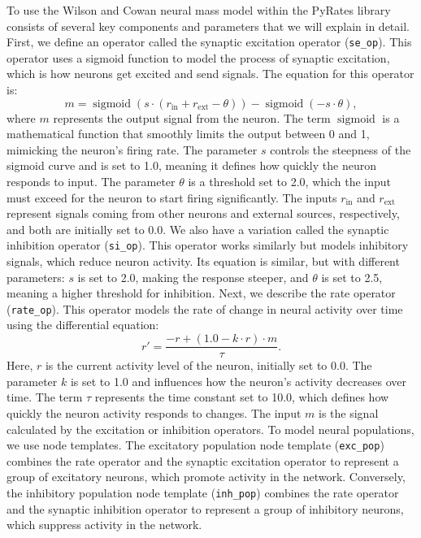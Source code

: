 \documentclass[12pt]{article}
\begin{document}
To use the Wilson and Cowan neural mass model within the PyRates library consists of several key components and parameters that we will explain in detail.
First, we define an operator called the synaptic excitation operator (\texttt{se\_op}). This operator uses a sigmoid function to model the process of synaptic excitation, which is how neurons get excited and send signals. The equation for this operator is:
\[
m = \operatorname{sigmoid}(s \cdot (r_{\mathrm{in}} + r_{\mathrm{ext}} - \theta)) - \operatorname{sigmoid}(-s \cdot \theta),
\]
where \( m \) represents the output signal from the neuron. The term \(\operatorname{sigmoid}\) is a mathematical function that smoothly limits the output between 0 and 1, mimicking the neuron's firing rate. The parameter \( s \) controls the steepness of the sigmoid curve and is set to 1.0, meaning it defines how quickly the neuron responds to input. The parameter \(\theta\) is a threshold set to 2.0, which the input must exceed for the neuron to start firing significantly. The inputs \( r_{\mathrm{in}} \) and \( r_{\mathrm{ext}} \) represent signals coming from other neurons and external sources, respectively, and both are initially set to 0.0.
We also have a variation called the synaptic inhibition operator (\texttt{si\_op}). This operator works similarly but models inhibitory signals, which reduce neuron activity. Its equation is similar, but with different parameters: \( s \) is set to 2.0, making the response steeper, and \( \theta \) is set to 2.5, meaning a higher threshold for inhibition.
Next, we describe the rate operator (\texttt{rate\_op}). This operator models the rate of change in neural activity over time using the differential equation:
\[
r' = \frac{-r + (1.0 - k \cdot r) \cdot m}{\tau}.
\]
Here, \( r \) is the current activity level of the neuron, initially set to 0.0. The parameter \( k \) is set to 1.0 and influences how the neuron's activity decreases over time. The term \( \tau \) represents the time constant set to 10.0, which defines how quickly the neuron activity responds to changes. The input \( m \) is the signal calculated by the excitation or inhibition operators.
To model neural populations, we use node templates. The excitatory population node template (\texttt{exc\_pop}) combines the rate operator and the synaptic excitation operator to represent a group of excitatory neurons, which promote activity in the network. Conversely, the inhibitory population node template (\texttt{inh\_pop}) combines the rate operator and the synaptic inhibition operator to represent a group of inhibitory neurons, which suppress activity in the network.
\end{document}
